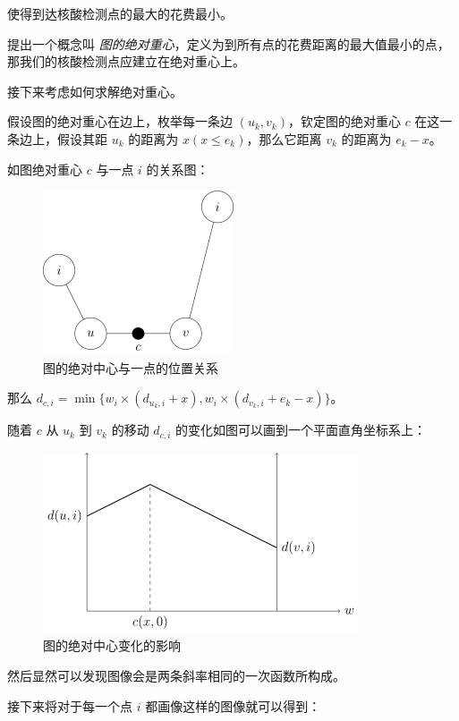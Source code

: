 \documentclass{cumcmthesis}
\begin{document}
使得到达核酸检测点的最大的花费最小。

提出一个概念叫 \emph{图的绝对重心}，定义为到所有点的花费距离的最大值最小的点，那我们的核酸检测点应建立在绝对重心上。

接下来考虑如何求解绝对重心。

假设图的绝对重心在边上，枚举每一条边 $(u_k,v_k)$，钦定图的绝对重心 $c$ 在这一条边上，假设其距 $u_k$ 的距离为 $x(x \le e_k)$，那么它距离 $v_k$ 的距离为 $e_k - x$。

如图绝对重心 $c$ 与一点 $i$ 的关系图：

\begin{figure}[H]
    \centering
    \includegraphics{images/mdst-graph.png}
    \caption{图的绝对中心与一点的位置关系\cite{oiwiki-dmst}}
    \label{fig:mdst-graph}
\end{figure}

那么 $d_{c,i} = \min\{w_i \times (d_{u_k, i} + x), w_i \times (d_{v_k,i} + e_k - x)\}$。

随着 $c$ 从 $u_k$ 到 $v_k$ 的移动 $d_{c,i}$ 的变化如图可以画到一个平面直角坐标系上：

\begin{figure}[H]
	\centering
	\includegraphics{images/mdst-plot1.png}
	\caption{图的绝对中心变化的影响\cite{oiwiki-dmst}}
	\label{fig:mdst-graph}
\end{figure}

然后显然可以发现图像会是两条斜率相同的一次函数所构成。

接下来将对于每一个点 $i$ 都画像这样的图像就可以得到：
\end{document}
